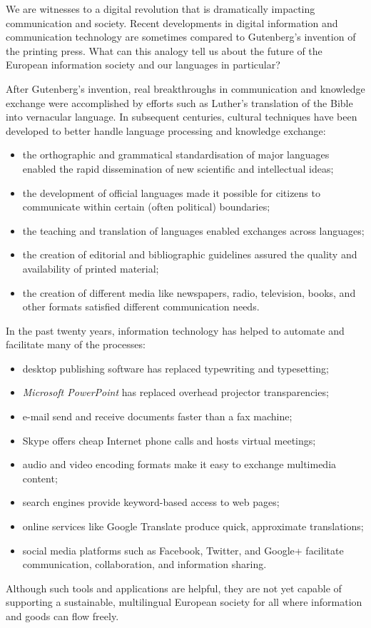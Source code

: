 \documentclass[]{../../metanetpaper}
\begin{document}
\begin{multicols}{2}

    We are witnesses to a digital revolution that is dramatically impacting communication and society. Recent developments in digital information and communication technology are sometimes compared to Gutenberg’s invention of the printing press. What can this analogy tell us about the future of the European information society and our languages in particular?

    After Gutenberg’s invention, real breakthroughs in communication and knowledge exchange were accomplished by efforts such as Luther’s translation of the Bible into vernacular language. In subsequent centuries, cultural techniques have been developed to better handle language processing and knowledge exchange:
    \begin{itemize}
      \item the orthographic and grammatical standardisation of major languages enabled the rapid dissemination of new 
      scientific and intellectual ideas;
      \item the development of official languages made it possible for citizens to communicate within certain (often 
      political) boundaries;
      \item the teaching and translation of languages enabled exchanges across languages;
      \item the creation of editorial and bibliographic guidelines assured the quality and availability of printed 
      material;
      \item the creation of different media like newspapers, radio, television, books, and other formats satisfied 
      different communication needs. 
    \end{itemize}
    In the past twenty years, information technology has helped to automate and facilitate many of the processes:
    \begin{itemize}
      \item desktop publishing software has replaced typewriting and typesetting;
      \item \textit{Microsoft PowerPoint} has replaced overhead projector transparencies;
      \item e-mail send and receive documents faster than a fax machine;
      \item Skype offers cheap Internet phone calls and hosts virtual meetings;
      \item audio and video encoding formats make it easy to exchange multimedia content;
      \item search engines provide keyword-based access to web pages;
      \item online services like Google Translate produce quick, approximate translations;
      \item social media platforms such as Facebook, Twitter, and Google+ facilitate communication, collaboration, and information sharing.
    \end{itemize}
    Although such tools and applications are helpful, they are not yet capable of supporting a sustainable, multilingual European society for all where information and goods can flow freely.


\end{multicols}
\end{document}
